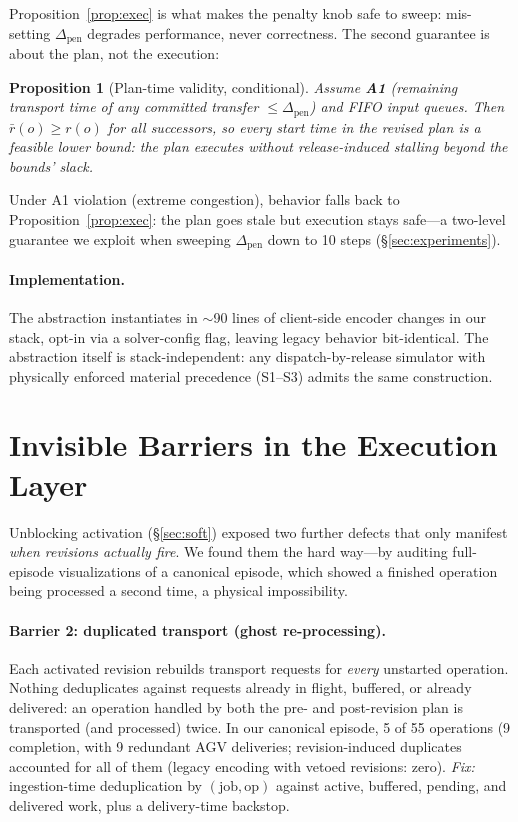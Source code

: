 \documentclass[twocolumn]{article}
\newtheorem{proposition}{Proposition}
\begin{document}
Proposition~\ref{prop:exec} is what makes the penalty knob safe to
sweep: mis-setting $\Delta_{\mathrm{pen}}$ degrades performance, never
correctness. The second guarantee is about the plan, not the execution:

\begin{proposition}[Plan-time validity, conditional]
\label{prop:plan}
Assume \textbf{A1} (remaining transport time of any committed transfer
$\le\Delta_{\mathrm{pen}}$) and FIFO input queues. Then
$\bar r(o)\ge r(o)$ for all successors, so every start time in the
revised plan is a feasible lower bound: the plan executes without
release-induced stalling beyond the bounds' slack.
\end{proposition}

Under A1 violation (extreme congestion), behavior falls back to
Proposition~\ref{prop:exec}: the plan goes stale but execution stays
safe---a two-level guarantee we exploit when sweeping
$\Delta_{\mathrm{pen}}$ down to 10 steps (\S\ref{sec:experiments}).

\paragraph{Implementation.}
The abstraction instantiates in $\sim$90 lines of client-side encoder
changes in our stack, opt-in via a solver-config flag, leaving legacy
behavior bit-identical. The abstraction itself is stack-independent:
any dispatch-by-release simulator with physically enforced material
precedence (S1--S3) admits the same construction.

\section{Invisible Barriers in the Execution Layer}
\label{sec:exec}
Unblocking activation (\S\ref{sec:soft}) exposed two further defects
that only manifest \emph{when revisions actually fire}. We found them
the hard way---by auditing full-episode visualizations of a canonical
episode, which showed a finished operation being processed a second
time, a physical impossibility.

\paragraph{Barrier 2: duplicated transport (ghost re-processing).}
Each activated revision rebuilds transport requests for \emph{every}
unstarted operation. Nothing deduplicates against requests already
in flight, buffered, or already delivered: an operation handled by both
the pre- and post-revision plan is transported (and processed) twice. In
our canonical episode, 5 of 55 operations (9\\%
completion, with 9 redundant AGV deliveries; revision-induced
duplicates accounted for all of them (legacy encoding with vetoed
revisions: zero). \emph{Fix:} ingestion-time deduplication by
$(\mathrm{job},\mathrm{op})$ against active, buffered, pending, and
delivered work, plus a delivery-time backstop.
\end{document}
